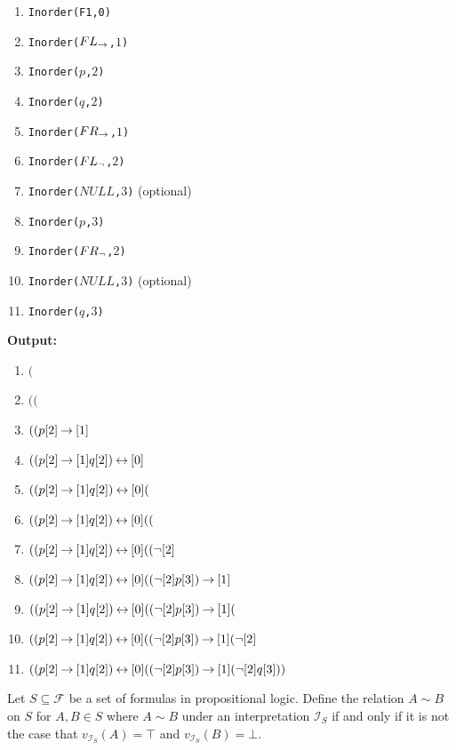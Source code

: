 \documentclass[]{exam}
\begin{document}
\begin{questions}
\begin{solution}
\begin{multicols}{2}
\begin{enumerate}
\item \texttt{Inorder(F1,0)}
\item \texttt{Inorder($FL_{\mathbin{\rightarrow}}$,$1$)}
\item \texttt{Inorder($p$,$2$)}
\item \texttt{Inorder($q$,$2$)}
\item \texttt{Inorder($FR_{\mathbin{\rightarrow}}$,$1$)}
\item \texttt{Inorder($FL_{\mathop{\neg}}$,$2$)}
\item \texttt{Inorder($NULL$,$3$)} (optional) 
\item \texttt{Inorder($p$,$3$)}
\item \texttt{Inorder($FR_{\mathop{\neg}}$,$2$)}
\item \texttt{Inorder($NULL$,$3$)} (optional) 
\item \texttt{Inorder($q$,$3$)}
\end{enumerate}
\columnbreak
{ \bf Output:}
\begin{enumerate}
\item $($
\item $(($
\item $((p[2] \mathbin{\rightarrow}[1]$
\item $((p[2] \mathbin{\rightarrow}[1] q[2]) \mathbin{\leftrightarrow}[0] $
\item $((p[2] \mathbin{\rightarrow}[1] q[2]) \mathbin{\leftrightarrow}[0] ($
\item $((p[2] \mathbin{\rightarrow}[1] q[2]) \mathbin{\leftrightarrow}[0] (($
\item $((p[2] \mathbin{\rightarrow}[1] q[2]) \mathbin{\leftrightarrow}[0] ((\mathop{\neg} [2]$
\item $((p[2] \mathbin{\rightarrow}[1] q[2]) \mathbin{\leftrightarrow}[0] ((\mathop{\neg} [2] p[3]) \mathbin{\rightarrow} [1] $
\item $((p[2] \mathbin{\rightarrow}[1] q[2]) \mathbin{\leftrightarrow}[0] ((\mathop{\neg} [2] p[3]) \mathbin{\rightarrow} [1] ($
\item $((p[2] \mathbin{\rightarrow}[1] q[2]) \mathbin{\leftrightarrow}[0] ((\mathop{\neg} [2] p[3]) \mathbin{\rightarrow} [1] (\mathop{\neg} [2] $
\item $((p[2] \mathbin{\rightarrow}[1] q[2]) \mathbin{\leftrightarrow}[0] ((\mathop{\neg} [2] p[3]) \mathbin{\rightarrow} [1] (\mathop{\neg} [2] q[3]))$
\end{enumerate}

\end{multicols}

\end{solution}
\question Let $S \subseteq \mathcal{F}$ be a set of formulas in propositional logic.
Define the relation $A\sim B$ on $S$ for $A,B \in S$ where $A\sim B$ under
an interpretation $\mathcal{I}_S$ if and only if it is not the case that
$v_{\mathcal{I}_S}(A) = \top$ and $v_{\mathcal{I}_S}(B) = \bot$.
\end{questions}
\end{document}

